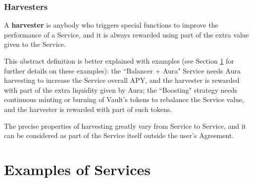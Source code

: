 \documentclass[a4paper,10 pt]{article}
\theoremstyle{definition}
\begin{document}
\subsubsection{Harvesters}\label{harvesterSubSub}
A {\bf harvester} is anybody who triggers special functions to improve the performance of a Service, and it is always rewarded using part of the extra value given to the Service. 

This abstract definition is better explained with examples (see Section \ref{servicesSec} for further details on these examples): the ``Balancer + Aura" Service needs Aura harvesting to increase the Service overall APY, and the harvester is rewarded with part of the extra liquidity given by Aura; the ``Boosting" strategy needs continuous minting or burning of Vault's tokens to rebalance the Service value, and the harvester is rewarded with part of such tokens.

The precise properties of harvesting greatly vary from Service to Service, and it can be considered as part of the Service itself outside the user's Agreement.

\section{Examples of Services}\label{servicesSec}
\end{document}

